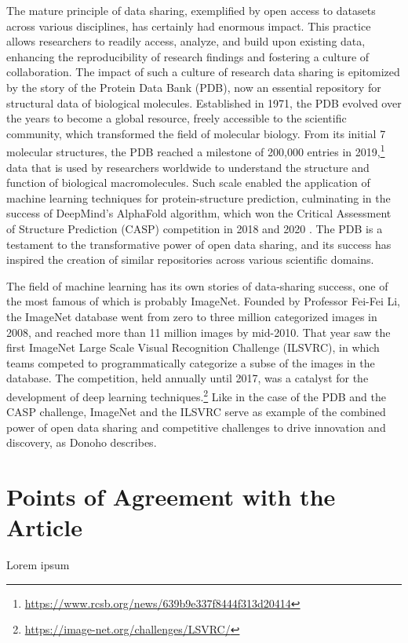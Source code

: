 \documentclass[]{hdsr}
\begin{document}
The mature principle of data sharing, exemplified by open access to datasets across various disciplines, has certainly had enormous impact. This practice allows researchers to readily access, analyze, and build upon existing data, enhancing the reproducibility of research findings and fostering a culture of collaboration.
The impact of such a culture of research data sharing is epitomized by the story of the Protein Data Bank (PDB), now an essential repository for structural data of biological molecules. Established in 1971, the PDB evolved over the years to become a global resource, freely accessible to the scientific community, which transformed the field of molecular biology. From its initial 7 molecular structures, the PDB reached a milestone of 200,000 entries in 2019,\footnote{\url{https://www.rcsb.org/news/639b9e337f8444f313d20414}} data that is used by researchers worldwide to understand the structure and function of biological macromolecules. Such scale enabled the application of machine learning techniques for protein-structure prediction, culminating in the success of DeepMind's AlphaFold algorithm, which won the Critical Assessment of Structure Prediction (CASP) competition in 2018 and 2020 \citep{jumper2021highly}. The PDB is a testament to the transformative power of open data sharing, and its success has inspired the creation of similar repositories across various scientific domains.

The field of machine learning has its own stories of data-sharing success, one of the most famous of which is probably ImageNet. Founded by Professor Fei-Fei Li, the ImageNet database went from zero to three million categorized images in 2008, and reached more than 11 million images by mid-2010. That year saw the first ImageNet Large Scale Visual Recognition Challenge (ILSVRC), in which teams competed to programmatically categorize a subse of the images in the database. The competition, held annually until 2017, was a catalyst for the development of deep learning techniques.\footnote{\url{https://image-net.org/challenges/LSVRC/}} Like in the case of the PDB and the CASP challenge, ImageNet and the ILSVRC serve as example of the combined power of open data sharing and competitive challenges to drive innovation and discovery, as Donoho describes.


\restoregeometry
{}

\section{Points of Agreement with the Article}
Lorem ipsum 
\end{document}
